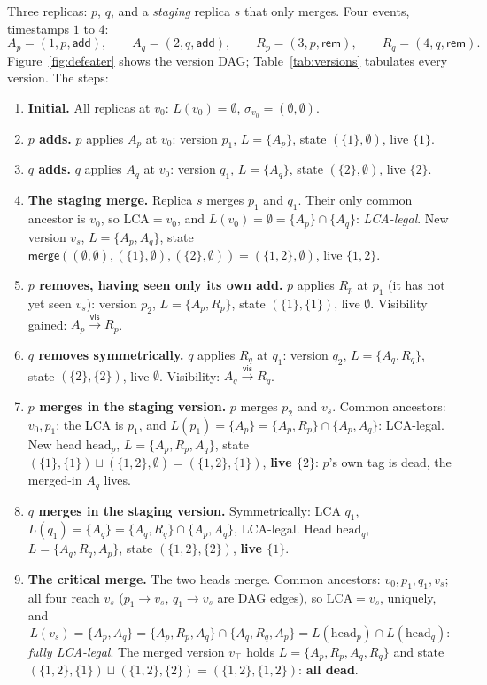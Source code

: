\documentclass[11pt]{article}
\newcommand{\vis}{\xrightarrow{\mathsf{vis}}}
\newcommand{\add}{\mathsf{add}}
\newcommand{\rem}{\mathsf{rem}}
\newcommand{\mergeL}{\mathsf{merge}}
\newcommand{\Ap}{A_p}
\newcommand{\Aq}{A_q}
\newcommand{\Rp}{R_p}
\newcommand{\Rq}{R_q}
\begin{document}
Three replicas: $p$, $q$, and a \emph{staging} replica $s$ that only
merges. Four events, timestamps $1$ to $4$:
\[
  \Ap = (1, p, \add), \qquad
  \Aq = (2, q, \add), \qquad
  \Rp = (3, p, \rem), \qquad
  \Rq = (4, q, \rem).
\]
Figure~\ref{fig:defeater} shows the version DAG;
Table~\ref{tab:versions} tabulates every version. The steps:

\begin{enumerate}[leftmargin=2.2em]
\item \textbf{Initial.} All replicas at $v_0$: $L(v_0) = \emptyset$,
  $\sigma_{v_0} = (\emptyset, \emptyset)$.
\item \textbf{$p$ adds.} $p$ applies $\Ap$ at $v_0$: version $p_1$,
  $L = \{\Ap\}$, state $(\{1\}, \emptyset)$, live $\{1\}$.
\item \textbf{$q$ adds.} $q$ applies $\Aq$ at $v_0$: version $q_1$,
  $L = \{\Aq\}$, state $(\{2\}, \emptyset)$, live $\{2\}$.
\item \textbf{The staging merge.} Replica $s$ merges $p_1$ and $q_1$.
  Their only common ancestor is $v_0$, so $\mathrm{LCA} = v_0$, and
  $L(v_0) = \emptyset = \{\Ap\} \cap \{\Aq\}$: \emph{LCA-legal}. New
  version $v_s$, $L = \{\Ap, \Aq\}$, state
  $\mergeL((\emptyset,\emptyset), (\{1\},\emptyset), (\{2\},\emptyset))
  = (\{1,2\}, \emptyset)$, live $\{1, 2\}$.
\item \textbf{$p$ removes, having seen only its own add.} $p$ applies
  $\Rp$ at $p_1$ (it has not yet seen $v_s$): version $p_2$,
  $L = \{\Ap, \Rp\}$, state $(\{1\}, \{1\})$, live $\emptyset$.
  Visibility gained: $\Ap \vis \Rp$.
\item \textbf{$q$ removes symmetrically.} $q$ applies $\Rq$ at $q_1$:
  version $q_2$, $L = \{\Aq, \Rq\}$, state $(\{2\}, \{2\})$, live
  $\emptyset$. Visibility: $\Aq \vis \Rq$.
\item \textbf{$p$ merges in the staging version.} $p$ merges $p_2$ and
  $v_s$. Common ancestors: $v_0, p_1$; the LCA is $p_1$, and
  $L(p_1) = \{\Ap\} = \{\Ap,\Rp\} \cap \{\Ap,\Aq\}$: LCA-legal. New
  head $\mathrm{head}_p$, $L = \{\Ap, \Rp, \Aq\}$, state
  $(\{1\},\{1\}) \sqcup (\{1,2\},\emptyset) = (\{1,2\}, \{1\})$,
  \textbf{live $\{2\}$}: $p$'s own tag is dead, the merged-in $\Aq$
  lives.
\item \textbf{$q$ merges in the staging version.} Symmetrically:
  LCA $q_1$, $L(q_1) = \{\Aq\} = \{\Aq,\Rq\} \cap \{\Ap,\Aq\}$,
  LCA-legal. Head $\mathrm{head}_q$, $L = \{\Aq, \Rq, \Ap\}$, state
  $(\{1,2\}, \{2\})$, \textbf{live $\{1\}$}.
\item \textbf{The critical merge.} The two heads merge. Common
  ancestors: $v_0, p_1, q_1, v_s$; all four reach $v_s$
  ($p_1 \to v_s$, $q_1 \to v_s$ are DAG edges), so
  $\mathrm{LCA} = v_s$, uniquely, and
  \[
    L(v_s) = \{\Ap, \Aq\}
    = \{\Ap,\Rp,\Aq\} \cap \{\Aq,\Rq,\Ap\}
    = L(\mathrm{head}_p) \cap L(\mathrm{head}_q):
  \]
  \emph{fully LCA-legal}. The merged version $v_\top$ holds
  $L = \{\Ap, \Rp, \Aq, \Rq\}$ and state
  $(\{1,2\},\{1\}) \sqcup (\{1,2\},\{2\}) = (\{1,2\}, \{1,2\})$:
  \textbf{all dead}.
\end{enumerate}
\end{document}
